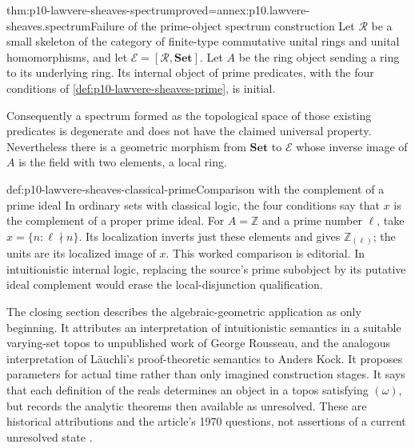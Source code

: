 \begin{hbtheorem}{thm:p10-lawvere-sheaves-spectrum}{proved=annex:p10.lawvere-sheaves.spectrum}{Failure of the prime-object spectrum construction}
Let \(\mathcal R\) be a small skeleton of the category of finite-type
commutative unital rings and unital homomorphisms, and let
\(\mathcal E=[\mathcal R,\mathbf{Set}]\). Let \(A\) be the ring object
sending a ring to its underlying ring. Its internal object of prime
predicates, with the four conditions of
\cref{def:p10-lawvere-sheaves-prime}, is initial.

Consequently a spectrum formed as the topological space of those
existing predicates is degenerate and does not have the claimed
universal property. Nevertheless there is a geometric morphism from
\(\mathbf{Set}\) to \(\mathcal E\) whose inverse image of \(A\)
is the field with two elements, a local ring.
\end{hbtheorem}

\begin{hbexample}{def:p10-lawvere-sheaves-classical-prime}{Comparison with the complement of a prime ideal}
In ordinary sets with classical logic, the four conditions say that
\(x\) is the complement of a proper prime ideal.  For
\(A=\mathbb Z\) and a prime number \(\ell\), take
\(x=\{n:\ell\nmid n\}\).  Its localization inverts just
these elements and gives \(\mathbb Z_{(\ell)}\); the units
are its localized image of \(x\).  This worked comparison is
editorial.  In intuitionistic internal logic, replacing the source's
prime subobject by its putative ideal complement would erase the
local-disjunction qualification.
\end{hbexample}





The closing section describes the algebraic-geometric application as
only beginning.  It attributes an interpretation of intuitionistic
semantics in a suitable varying-set topos to unpublished work of
George Rousseau, and the analogous interpretation of L\"auchli's
proof-theoretic semantics to Anders Kock.  It proposes parameters for
actual time rather than only imagined construction stages.  It says
that each definition of the reals determines an object in a topos
satisfying \((\omega)\), but records the analytic theorems then
available as unresolved.  These are historical attributions and the
article's 1970 questions, not assertions of a current unresolved
state \cite[p.~334]{Lawvere1970}.

